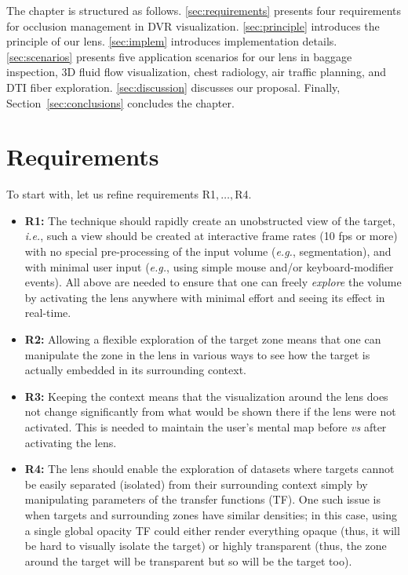 The chapter is structured as follows. \autoref{sec:requirements} presents four requirements for occlusion management in DVR visualization. \autoref{sec:principle} introduces the principle of our lens. \autoref{sec:implem} introduces implementation details.\autoref{sec:scenarios} presents five application scenarios for our lens in baggage inspection, 3D fluid flow visualization, chest radiology, air traffic planning, and DTI fiber exploration. \autoref{sec:discussion} discusses our proposal. Finally, Section~\autoref{sec:conclusions} concludes the chapter.

\section{Requirements}
\label{sec:requirements}

To start with, let us refine requirements R1$,\ldots,$R4.
\begin{itemize}
\item{\textbf{R1:}} The technique should rapidly create an unobstructed view of the target, \emph{i.e.}, such a view should be created at interactive frame rates (10 fps or more) with no special pre-processing of the input volume (\emph{e.g.}, segmentation), and with minimal user input (\emph{e.g.}, using simple mouse and/or keyboard-modifier events). All above are needed to ensure that one can freely \emph{explore} the volume by activating the lens anywhere with minimal effort and seeing its effect in real-time.

\item{\textbf{R2:}} Allowing a flexible exploration of the target zone means that one can manipulate the zone in the lens in various ways to see how the target is actually embedded in its surrounding context.

\item{\textbf{R3:}} Keeping the context means that the visualization around the lens does not change significantly from what would be shown there if the lens were not activated. This is needed to maintain the user's mental map before \emph{vs} after activating the lens.

\item{\textbf{R4:}} The lens should enable the exploration of datasets where targets cannot be easily separated (isolated) from their surrounding context simply by manipulating parameters of the transfer functions (TF). One such issue is when targets and surrounding zones have similar densities; in this case, using a single global opacity TF could either render everything opaque (thus, it will be hard to visually isolate the target) or highly transparent (thus, the zone around the target will be transparent but so will be the target too).
\end{itemize}


